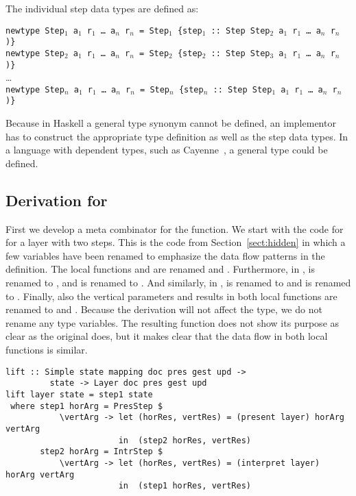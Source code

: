 The individual step data types are defined as:

\begin{small}
{\tt newtype Step$_1$ a$_1$ r$_1$ \dots ~a$_n$ r$_n$ = Step$_1$ \{step$_1$}\verb| :: |{\tt Step Step$_2$ a$_1$ r$_1$ \dots ~a$_n$ r$_n$ )\}}\\
{\tt newtype Step$_2$ a$_1$ r$_1$ \dots ~a$_n$ r$_n$ = Step$_2$ \{step$_2$}\verb| :: |{\tt Step Step$_3$ a$_1$ r$_1$ \dots ~a$_n$ r$_n$ )\}}\\
\dots\\
{\tt newtype Step$_n$ a$_1$ r$_1$ \dots ~a$_n$ r$_n$ = Step$_n$ \{step$_n$}\verb| :: |{\tt Step Step$_1$ a$_1$ r$_1$ \dots ~a$_n$ r$_n$ )\}}
\end{small}

Because in Haskell a general  type synonym cannot be defined, an implementor has to construct the appropriate  type definition as well as the step data types. In a language with dependent types, such as Cayenne~\cite{augustsson98cayenne}, a general type  could be defined.


%																
\subsection{Derivation for }

First we develop a meta combinator for the  function. We start with the code for  for a layer with two steps. This is the code from Section~\ref{sect:hidden} in which a few variables have been renamed to emphasize the data flow patterns in the definition.
\bc The local functions  and  are renamed  and . Furthermore, in ,  is renamed to , and  is renamed to . And similarly, in ,  is renamed to  and  is renamed to . Finally, also the vertical parameters and results in both local functions are renamed to  and . Because the derivation will not affect the type, we do not rename any type variables. The resulting function does not show its purpose as clear as the original does, but it makes clear that the data flow in both local functions is similar. \ec


\begin{small} %
\begin{verbatim}
lift :: Simple state mapping doc pres gest upd ->
         state -> Layer doc pres gest upd
lift layer state = step1 state 
 where step1 horArg = PresStep $ 
           \vertArg -> let (horRes, vertRes) = (present layer) horArg vertArg                                         
                       in  (step2 horRes, vertRes)
       step2 horArg = IntrStep $
           \vertArg -> let (horRes, vertRes) = (interpret layer) horArg vertArg                     
                       in  (step1 horRes, vertRes)
\end{verbatim}
\end{small}

